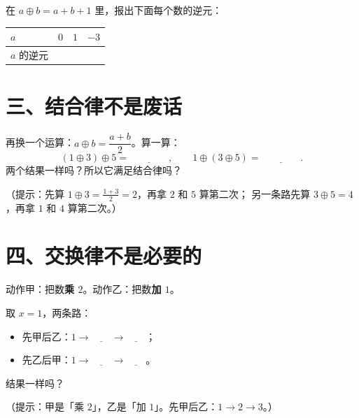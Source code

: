 \begin{dongshou}[用手指回答]
  在 \(a\oplus b=a+b+1\) 里，报出下面每个数的逆元：
  \begin{center}
  \begin{tabular}{@{}lccc@{}}
    \toprule
    \(a\) & \(0\) & \(1\) & \(-3\) \\
    \midrule
    \(a\) 的逆元 & \hspace{1.6em} & \hspace{1.6em} & \hspace{1.6em} \\
    \bottomrule
  \end{tabular}
  \end{center}
\end{dongshou}

\section*{三、结合律不是废话}

\begin{dongshou}
  再换一个运算：\(a\oplus b=\dfrac{a+b}{2}\)。算一算：
  \[
    (1\oplus3)\oplus5=\underline{\hspace{4em}}, \qquad
    1\oplus(3\oplus5)=\underline{\hspace{4em}} .
  \]
  两个结果一样吗？\underline{\hspace{4em}}\quad 所以它满足结合律吗？\underline{\hspace{4em}}

  （提示：先算 \(1\oplus3=\frac{1+3}{2}=2\)，再拿 \(2\) 和 \(5\) 算第二次；
  另一条路先算 \(3\oplus5=4\)，再拿 \(1\) 和 \(4\) 算第二次。）
\end{dongshou}

\section*{四、交换律不是必要的}

\begin{example}
  动作甲：把数\textbf{乘 \(2\)}。\qquad 动作乙：把数\textbf{加 \(1\)}。

  取 \(x=1\)，两条路：

  \begin{itemize}
    \item 先甲后乙：\(1\to\underline{\hspace{2em}}\to\underline{\hspace{2em}}\)；
    \item 先乙后甲：\(1\to\underline{\hspace{2em}}\to\underline{\hspace{2em}}\)。
  \end{itemize}

  结果一样吗？\underline{\hspace{4em}}

  （提示：甲是「乘 \(2\)」，乙是「加 \(1\)」。先甲后乙：\(1\to2\to3\)。）
\end{example}


